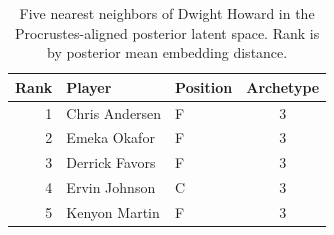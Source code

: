 \begin{table}[htbp]
  \centering\small
  \begin{tabular}{rllc}
    \toprule
    Rank & Player & Position & Archetype \\
    \midrule
    1 & Chris Andersen & F & 3 \\
    2 & Emeka Okafor & F & 3 \\
    3 & Derrick Favors & F & 3 \\
    4 & Ervin Johnson & C & 3 \\
    5 & Kenyon Martin & F & 3 \\
    \bottomrule
  \end{tabular}
  \caption{Five nearest neighbors of Dwight Howard in the Procrustes-aligned posterior latent space. Rank is by posterior mean embedding distance.}
  \label{tab:Dwight_Howard_neighbors}
\end{table}

